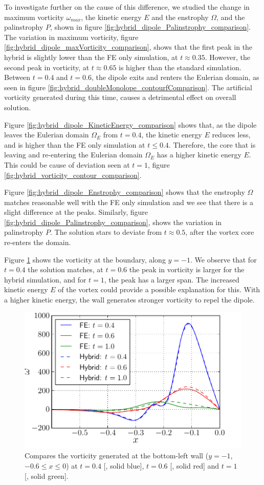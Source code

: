 To investigate further on the cause of this difference, we studied the change in maximum vorticity $\omega_{max}$, the kinetic energy $E$ and the enstrophy $\Omega$, and the palinstrophy $P$, shown in figure \ref{fig:hybrid_dipole_Palinstrophy_comparison}. The variation in maximum vorticity, figure \ref{fig:hybrid_dipole_maxVorticity_comparison}, shows that the first peak in the hybrid is slightly lower than the FE only simulation, at $t\approx 0.35$. However, the second peak in vorticity, at $t\approx0.65$ is higher than the standard simulation. Between $t=0.4$ and $t=0.6$, the dipole exits and renters the Eulerian domain, as seen in figure \ref{fig:hybrid_doubleMonolope_contourfComparison}. The artificial vorticity generated during this time, causes a detrimental effect on overall solution. 

Figure \ref{fig:hybrid_dipole_KineticEnergy_comparison} shows that, as the dipole leaves the Eulerian domain $\Omega_E$ from $t=0.4$, the kinetic energy $E$ reduces less, and is higher than the FE only simulation at $t\leq0.4$. Therefore, the core that is leaving and re-entering the Eulerian domain $\Omega_E$ has a higher kinetic energy $E$. This could be cause of deviation seen at $t=1$, figure \ref{fig:hybrid_vorticity_contour_comparison}.

Figure \ref{fig:hybrid_dipole_Enstrophy_comparison} shows that the enstrophy $\Omega$ matches reasonable well with the FE only simulation and we see that there is a slight difference at the peaks. Similarly, figure \ref{fig:hybrid_dipole_Palinstrophy_comparison}, shows the variation in palinstrophy $P$. The solution stars to deviate from $t\approx0.5$, after the vortex core re-enters the domain.

Figure \ref{fig:hybrid_doubleMonopole_vorticityAtBoundary} shows the vorticity at the boundary, along $y=-1$. We observe that for $t=0.4$ the solution matches, at $t=0.6$ the peak in vorticity is larger for the hybrid simulation, and for $t=1$, the peak has a larger span. The increased kinetic energy $E$ of the vortex could provide a possible explanation for this. With a higher kinetic energy, the wall generates stronger vorticity to repel the dipole.

	\begin{figure}[!t]
	\showthe\columnwidth
	\centering
	\includegraphics[width=0.5\linewidth]{./figures/hybrid/cbColl/hybrid_doubleMonopole_vorticityAtBoundary.pdf}
	\caption{Compares the vorticity generated at the bottom-left wall ($y=-1$, $-0.6\leqslant x \leqslant 0$) at $t=0.4$ [{\color{plotBlue}{---}}, solid blue], $t=0.6$ [{\color{plotRed}{---}}, solid red] and $t=1$ [{\color{plotGreen}{---}}, solid green].}
	\label{fig:hybrid_doubleMonopole_vorticityAtBoundary}
	\end{figure}

